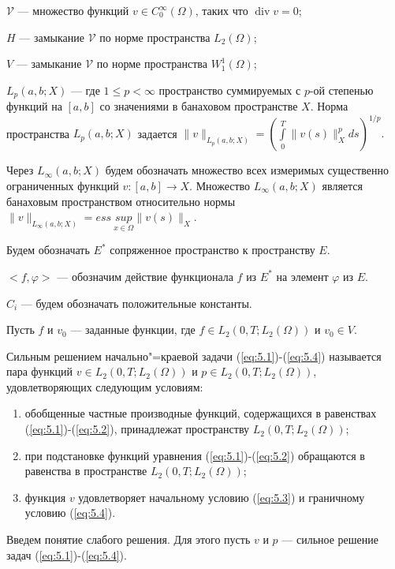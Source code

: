 $\mathcal{V}$ --- множество функций $v\in C_0^{\infty}(\Omega)$, таких что $\operatorname{div}v=0$;

$H$ --- замыкание $\mathcal{V}$ по норме пространства $L_2(\Omega)$;

$V$ --- замыкание $\mathcal{V}$ по норме пространства $W_1^1(\Omega)$;

$L_p(a,b;X)$ --- где $1\le p< \infty$ пространство суммируемых с $p$-ой степенью функций на $[a, b]$ со значениями в
банаховом пространстве $X$. Норма пространства $L_p(a, b;X)$ задается
$\|v\|_{L_p(a, b;X)}=(\int\limits_0^T\|v(s)\|_X^p ds)^{1/p}.$

Через $L_{\infty}(a,b;X)$ будем обозначать множество всех измеримых существенно ограниченных функций $v:[a,b]\rightarrow X$.
Множество $L_{\infty}(a,b;X)$ является банаховым пространством относительно нормы $\|v\|_{L_{\infty}(a,b;X)}=ess \ \underset{x\in\Omega}{sup} \|v(s)\|_X$.

Будем обозначать $E^*$ сопряженное пространство к пространству $E$.

$<f,\varphi>$ --- обозначим действие функционала $f$ из $E^*$ на элемент $\varphi$ из $E$.

$C_i$ --- будем обозначать положительные константы.

Пусть $f$ и $v_0$ --- заданные функции,
где $f\in L_2(0, T; L_2(\Omega))$ и $v_0\in V$.

\begin{definition}
    Сильным решением начально"=краевой задачи (\ref{eq:5.1})-(\ref{eq:5.4}) называется пара функций $v\in L_2(0, T; L_2(\Omega))$ и
    $p\in L_2(0, T; L_2(\Omega))$, удовлетворяющих следующим условиям:
\end{definition}

\begin{enumerate}
    \item обобщенные частные производные функций, содержащихся в равенствах (\ref{eq:5.1})-(\ref{eq:5.2}), принадлежат пространству $L_2(0, T; L_2(\Omega))$;
    \item при подстановке функций уравнения (\ref{eq:5.1})-(\ref{eq:5.2}) обращаются в равенства в пространстве $L_2(0, T; L_2(\Omega))$;
    \item функция $v$ удовлетворяет начальному условию (\ref{eq:5.3}) и граничному условию (\ref{eq:5.4}).
\end{enumerate}

Введем понятие слабого решения. Для этого пусть $v$ и $p$ --- сильное решение задач (\ref{eq:5.1})-(\ref{eq:5.4}).


